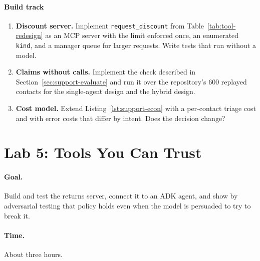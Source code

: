 \paragraph{Build track}
\begin{enumerate}[resume, itemsep=2pt]
  \item \textbf{Discount server.} Implement \texttt{request\_discount} from Table~\ref{tab:tool-redesign} as an MCP server with the limit enforced once, an enumerated \texttt{kind}, and a manager queue for larger requests. Write tests that run without a model.
  \item \textbf{Claims without calls.} Implement the check described in Section~\ref{sec:support-evaluate} and run it over the repository's 600 replayed contacts for the single-agent design and the hybrid design.
  \item \textbf{Cost model.} Extend Listing~\ref{lst:support-econ} with a per-contact triage cost and with error costs that differ by intent. Does the decision change?
\end{enumerate}

\section*{Lab 5: Tools You Can Trust}

\paragraph{Goal.} Build and test the returns server, connect it to an ADK agent, and show by adversarial testing that policy holds even when the model is persuaded to try to break it.

\paragraph{Time.} About three hours.

